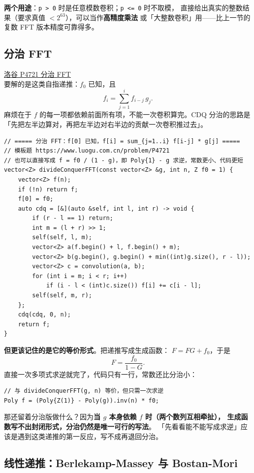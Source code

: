 		\textbf{两个用途}：\texttt{p > 0} 时是任意模数卷积；\texttt{p <= 0} 时不取模，
		直接给出真实的整数结果（要求真值 $< 2^{63}$），可以当作\textbf{高精度乘法}
		或「大整数卷积」用——比上一节的复数 FFT 版本精度可靠得多。

		\subsection{分治 FFT}

		\href{https://www.luogu.com.cn/problem/P4721}{洛谷 P4721 分治 FFT} \\

		要解的是这类自指递推：$f_0$ 已知，且
		$$f_i = \sum_{j=1}^{i} f_{i-j}\, g_j .$$
		麻烦在于 $f$ 的每一项都依赖前面所有项，不能一次卷积算完。CDQ 分治的思路是
		「先把左半边算对，再把左半边对右半边的贡献一次卷积推过去」。

		\begin{verbatim}
// ===== 分治 FFT：f[0] 已知，f[i] = sum_{j=1..i} f[i-j] * g[j] =====
// 模板题 https://www.luogu.com.cn/problem/P4721
// 也可以直接写成 f = f0 / (1 - g)，即 Poly{1} - g 求逆，常数更小、代码更短
vector<Z> divideConquerFFT(const vector<Z> &g, int n, Z f0 = 1) {
    vector<Z> f(n);
    if (!n) return f;
    f[0] = f0;
    auto cdq = [&](auto &self, int l, int r) -> void {
        if (r - l == 1) return;
        int m = (l + r) >> 1;
        self(self, l, m);
        vector<Z> a(f.begin() + l, f.begin() + m);
        vector<Z> b(g.begin(), g.begin() + min((int)g.size(), r - l));
        vector<Z> c = convolution(a, b);
        for (int i = m; i < r; i++)
            if (i - l < (int)c.size()) f[i] += c[i - l];
        self(self, m, r);
    };
    cdq(cdq, 0, n);
    return f;
}
		\end{verbatim}

		\textbf{但更该记住的是它的等价形式}。把递推写成生成函数：
		$F = F G + f_0$，于是
		$$F = \frac{f_0}{1 - G}.$$
		直接一次多项式求逆就完了，代码只有一行，常数还比分治小：

		\begin{verbatim}
// 与 divideConquerFFT(g, n) 等价，但只需一次求逆
Poly f = (Poly{Z(1)} - Poly(g)).inv(n) * f0;
		\end{verbatim}

		那还留着分治版做什么？因为\textbf{当 $g$ 本身依赖 $f$ 时（两个数列互相牵扯），
		生成函数写不出封闭形式，分治仍然是唯一可行的写法}。
		「先看看能不能写成求逆」应该是遇到这类递推的第一反应，写不成再退回分治。

		\subsection{线性递推：Berlekamp-Massey 与 Bostan-Mori}

